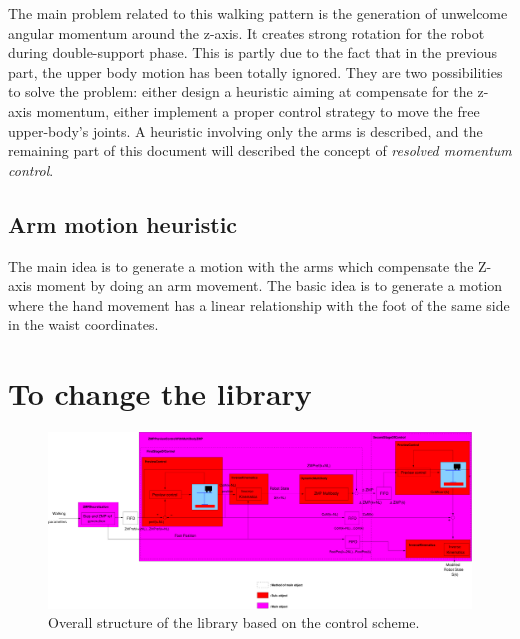 The main problem related to this walking pattern is the generation of
unwelcome angular momentum around the z-axis. It creates strong rotation
for the robot during double-support phase. This is partly due to the fact that
in the previous part, the upper body motion has been totally ignored.
They are two possibilities to solve the problem: either design a heuristic 
aiming at compensate for the z-axis momentum, either implement a proper
control strategy to move the free upper-body's joints.
A heuristic involving only the arms is described, and the remaining part
of this document will described the concept of \textit{resolved momentum control}.

\subsection{Arm motion heuristic}

The main idea is to generate a motion with the arms which compensate the Z-axis moment 
by doing an arm movement. The basic idea is to generate a motion where the hand movement
has a linear relationship with the foot of the same side in the waist coordinates.




\section{To change the library}

\begin{figure}[htb]
\begin{center}
\includegraphics[angle=270,width=0.7\linewidth]{./figures/PatternGenerator/ZMPSchemeSoftware}
\caption{Overall structure of the library based on the control scheme.}
\label{pic:OverallStructure}
\end{center}
\end{figure}

